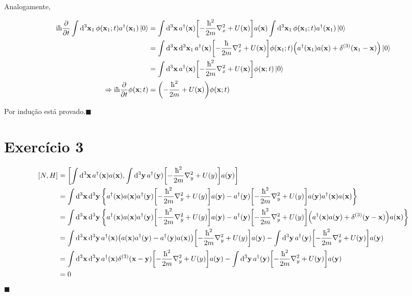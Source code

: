 \documentclass[twoside]{amsart}
\newcommand{\cqd}{\hfill$\blacksquare$}
\numberwithin{equation}{section}
\begin{document}
Analogamente,

\begin{align*}
    \im\hbar\pdv{}{t}\int\dd[3]{\vb x_1}\phi\qty(\vb x_1;t)a^\dagger\qty(\vb x_1)\ket 0&=\int\dd[3]{\vb x}a^\dagger\qty(\vb x)\qty[-\frac{\hbar^2}{2m}\laplacian_x+U\qty(\vb x)]a\qty(\vb x)\int\dd[3]{\vb x_1}\phi\qty(\vb x_1;t)a^\dagger\qty(\vb x_1)\ket 0\\
    &=\int\dd[3]{\vb x}\dd[3]{\vb x_1}a^\dagger\qty(\vb x)\qty[-\frac{\hbar}{2m}\laplacian_x+U\qty(\vb x)]\phi\qty(\vb x_1;t)\qty(a^\dagger\qty(\vb x_1)a\qty(\vb x)+\delta^{\qty(3)}\qty(\vb x_1-\vb x))\ket 0\\
    &=\int\dd[3]{\vb x}a^\dagger\qty(\vb x)\qty[-\frac{\hbar^2}{2m}\laplacian_x+U\qty(\vb x)]\phi\qty(\vb x;t)\ket 0\\
    \Rightarrow\im\hbar\pdv{}{t}\phi\qty(\vb x;t)&=\qty(-\frac{\hbar^2}{2m}+U\qty(\vb x))\phi\qty(\vb x;t)
\end{align*}

Por indução está provado.\cqd


\section{Exercício 3}

\begin{align*}
    \comm{N}{H}&=\comm{\int\dd[3]{\vb x}a^\dagger\qty(\vb x)a\qty(\vb x)}{\int\dd[3]{\vb y}a^\dagger\qty(\vb y)\qty[-\frac{\hbar^2}{2m}\laplacian_y+U\qty(y)]a\qty(\vb y)}\\
    &=\int\dd[3]{\vb x}\dd[3]{\vb y}\qty{a^\dagger\qty(\vb x)a\qty(\vb x)a^\dagger\qty(\vb y)\qty[-\frac{\hbar^2}{2m}\laplacian_y+U\qty(y)]a\qty(\vb y)-a^\dagger\qty(\vb y)\qty[-\frac{\hbar^2}{2m}\laplacian_y+U\qty(y)]a\qty(\vb y)a^\dagger\qty(\vb x)a\qty(\vb x)}\\
    &=\int\dd[3]{\vb x}\dd[3]{\vb y}\qty{a^\dagger\qty(\vb x)a\qty(\vb x)a^\dagger\qty(\vb y)\qty[-\frac{\hbar^2}{2m}\laplacian_y+U\qty(y)]a\qty(\vb y)-a^\dagger\qty(\vb y)\qty[-\frac{\hbar^2}{2m}\laplacian_y+U\qty(y)]\qty(a^\dagger\qty(\vb x)a\qty(\vb y)+\delta^{\qty(3)}\qty(\vb y-\vb x))a\qty(\vb x)}\\
    &=\int\dd[3]{\vb x}\dd[3]{\vb y}a^\dagger\qty(\vb x)\qty(a\qty(\vb x)a^\dagger\qty(\vb y)-a^\dagger\qty(\vb y)a\qty(\vb x))\qty[-\frac{\hbar^2}{2m}\laplacian_y+U\qty(y)]a\qty(\vb y)-\int\dd[3]{\vb y}a^\dagger\qty(\vb y)\qty[-\frac{\hbar^2}{2m}\laplacian_y+U\qty(\vb y)]a\qty(\vb y)\\
    &=\int\dd[3]{\vb x}\dd[3]{\vb y}a^\dagger\qty(\vb x)\delta^{\qty(3)}\qty(\vb x-\vb y)\qty[-\frac{\hbar^2}{2m}\laplacian_y+U\qty(y)]a\qty(\vb y)-\int\dd[3]{\vb y}a^\dagger\qty(\vb y)\qty[-\frac{\hbar^2}{2m}\laplacian_y+U\qty(\vb y)]a\qty(\vb y)\\
    &=0
\end{align*}
\cqd
\end{document}
